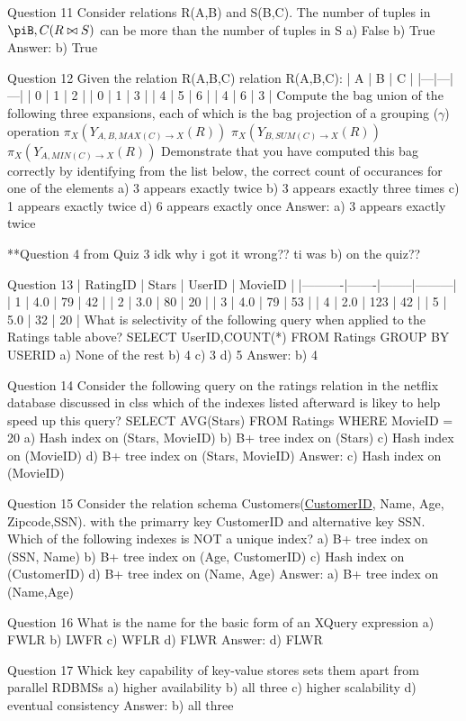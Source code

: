 Question 11
Consider relations R(A,B) and S(B,C). The number of tuples in $\piB,C(R\bowtie S)$ can be more than the number of tuples in S
a) False
b) True
Answer: b) True


Question 12
Given the relation R(A,B,C)
relation  R(A,B,C):
| A | B | C |
|---|---|---|
| 0 | 1 | 2 |
| 0 | 1 | 3 |
| 4 | 5 | 6 |
| 4 | 6 | 3 |
Compute the bag union of the following three expansions, each of which is the bag projection of a grouping ($\gamma$) operation
$\pi_{X}(Y_{A,B, MAX(C)\to X}(R))$
$\pi_{X}(Y_{B, SUM(C)\to X}(R))$
$\pi_{X}(Y_{A,MIN(C)\to X}(R))$
Demonstrate that you have computed this bag correctly by identifying from the list below, the correct count of occurances for one of the elements
a) 3 appears exactly twice
b) 3 appears exactly three times
c) 1 appears exactly twice
d) 6 appears exactly once
Answer: a) 3 appears exactly twice

**Question 4 from Quiz 3
idk why i got it wrong?? ti was b) on the quiz??

Question 13
| RatingID | Stars | UserID | MovieID |
|----------|-------|--------|---------|
| 1        | 4.0   | 79     | 42      |
| 2        | 3.0   | 80     | 20      |
| 3        | 4.0   | 79     | 53      |
| 4        | 2.0   | 123    | 42      |
| 5        | 5.0   | 32     | 20      |
What is selectivity of the following query when applied to the Ratings table above?
SELECT UserID,COUNT(*)
FROM Ratings
GROUP BY USERID
a) None of the rest
b) 4
c) 3
d) 5
Answer: b) 4

Question 14
Consider the following query on the ratings relation in the netflix database discussed in clss which of the indexes listed afterward is likey to help speed up this query?
SELECT AVG(Stars)
FROM Ratings 
WHERE MovieID = 20
a) Hash index on (Stars, MovieID)
b) B+ tree index on (Stars)
c) Hash index on (MovieID)
d) B+ tree index on (Stars, MovieID)
Answer: c) Hash index on (MovieID)

Question 15
Consider the relation schema Customers(\underline{CustomerID}, Name, Age, Zipcode,SSN). with the primarry key CustomerID and alternative key SSN. Which of the following indexes is NOT a unique index?
a) B+ tree index on (SSN, Name)
b) B+ tree index on (Age, CustomerID)
c) Hash index on (CustomerID)
d) B+ tree index on (Name, Age)
Answer: a) B+ tree index on (Name,Age)

Question 16
What is the name for the basic form of an XQuery expression
a) FWLR
b) LWFR
c) WFLR
d) FLWR
Answer: d) FLWR

Question 17
Whick key capability of key-value stores sets them apart from parallel RDBMSs
a) higher availability
b) all three
c) higher scalability
d) eventual consistency
Answer: b) all three

